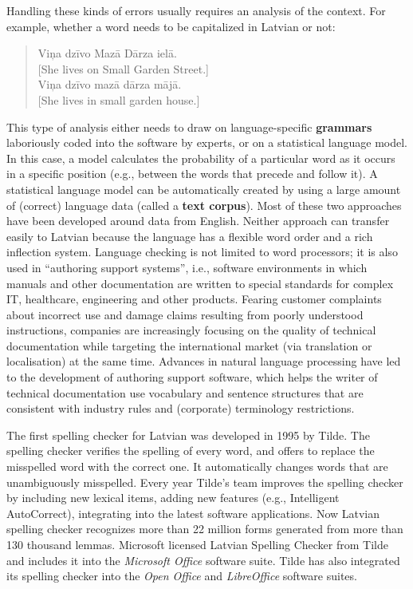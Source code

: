 \begin{multicols}{2}
Handling these kinds of errors usually requires an analysis of the context.
For example, whether a word needs to be capitalized in Latvian or not:
\begin{quote}
Viņa dzīvo Mazā Dārza ielā.\\
{[}She lives on Small Garden Street.{]}\\
Viņa dzīvo mazā dārza mājā.\\
{[}She lives in small garden house.{]}
\end{quote}

This type of analysis either needs to draw on language-specific \textbf{grammars} laboriously coded into the software by experts, or on a statistical language model.
In this case, a model calculates the probability of a particular word as it occurs in a specific position (e.g., between the words that precede and follow it).
A statistical language model can be automatically created by using a large amount of (correct) language data (called a \textbf{text corpus}).
Most of these two approaches have been developed around data from English.
Neither approach can transfer easily to Latvian because the language has a flexible word order and a rich inflection system. 
Language checking is not limited to word processors; it is also used in ``authoring support systems'', i.e., software environments in which manuals and other documentation are written to special standards for complex IT, healthcare, engineering and other products.
Fearing customer complaints about incorrect use and damage claims resulting from poorly understood instructions, companies are increasingly focusing on the quality of technical documentation while targeting the international market (via translation or localisation) at the same time.
Advances in natural language processing have led to the development of authoring support software, which helps the writer of technical documentation use vocabulary and sentence structures that are consistent with industry rules and (corporate) terminology restrictions.

The first spelling checker for Latvian was developed in 1995 by Tilde.
The spelling checker verifies the spelling of every word, and offers to replace the misspelled word with the correct one.
It automatically changes words that are unambiguously misspelled.
Every year Tilde's team improves the spelling checker by including new lexical items, adding new features (e.g., Intelligent AutoCorrect), integrating into the latest software applications.
Now Latvian spelling checker recognizes more than 22 million forms generated from more than 130 thousand lemmas.
Microsoft licensed Latvian Spelling Checker from Tilde and includes it into the \textit{Microsoft Office }software suite.
Tilde has also integrated its spelling checker into the \textit{Open Office }and\textit{ LibreOffice} software suites.


\end{multicols}
